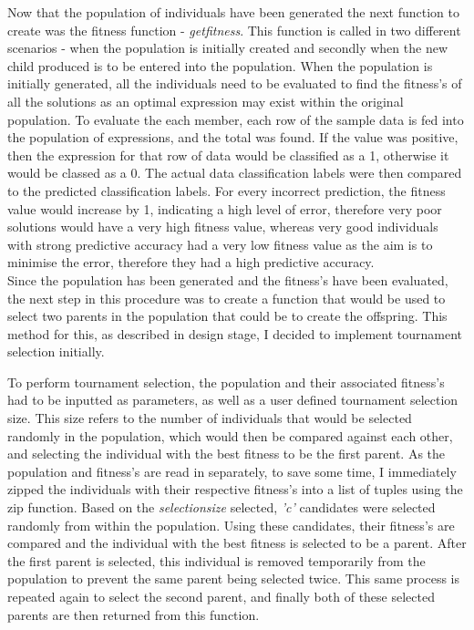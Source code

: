 \documentclass[11pt]{article}
\begin{document}
Now that the population of individuals have been generated the next function to create was the fitness function - \textit{get\textunderscore fitness}. This function is called in two different scenarios - when the population is initially created and secondly when the new child produced is to be entered into the population. When the population is initially generated, all the individuals need to be evaluated to find the fitness's of all the solutions as an optimal expression may exist within the original population. To evaluate the each member, each row of the sample data is fed into the population of expressions, and the total was found. If the value was positive, then the expression for that row of data would be classified as a 1, otherwise it would be classed as a 0. The actual data classification labels were then compared to the predicted classification labels. For every incorrect prediction, the fitness value would increase by 1, indicating a high level of error, therefore very poor solutions would have a very high fitness value, whereas very good individuals with strong predictive accuracy had a very low fitness value as the aim is to minimise the error, therefore they had a high predictive accuracy.\\

Since the population has been generated and the fitness's have been evaluated, the next step in this procedure was to create a function that would be used to select two parents in the population that could be to create the offspring. This method for this, as described in design stage, I decided to implement tournament selection initially.

To perform tournament selection, the population and their associated fitness's had to be inputted as parameters, as well as a user defined tournament selection size. This size refers to the number of individuals that would be selected randomly in the population, which would then be compared against each other, and selecting the individual with the best fitness to be the first parent. As the population and fitness's are read in separately, to save some time, I immediately zipped the individuals with their respective fitness's into a list of tuples using the zip function. Based on the \textit{selection\textunderscore size} selected, \textit{'c'} candidates were selected randomly from within the population.  Using these candidates, their fitness's are compared and the individual with the best fitness is selected to be a parent. 
After the first parent is selected, this individual is removed temporarily from the population to prevent the same parent being selected twice. This same process is repeated again to select the second parent, and finally both of these selected parents are then returned from this function. \\
\end{document}
